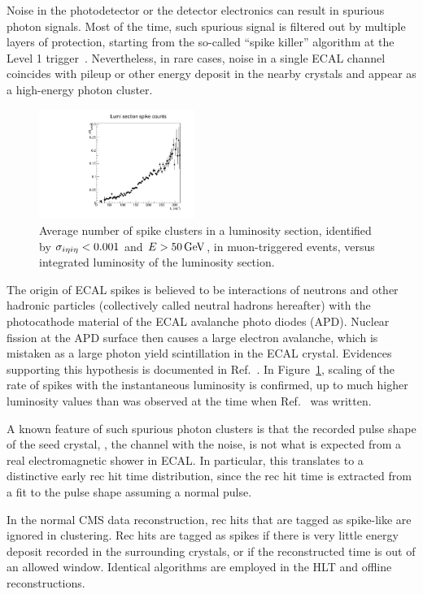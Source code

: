 Noise in the photodetector or the detector electronics can result in spurious photon signals. 
Most of the time, such spurious signal is filtered out by multiple layers of protection, starting from the so-called ``spike killer'' algorithm at the Level 1 trigger~\cite{CMS_AN_2010-357}. 
Nevertheless, in rare cases, noise in a single ECAL channel coincides with pileup or other energy deposit in the nearby crystals and appear as a high-energy photon cluster.

\begin{figure}[tbp]
  \centering
  \includegraphics[width=0.45\textwidth]{Reconstruction/Figures/spikes/spike_lumi_scaling.pdf}
  \caption{
    Average number of spike clusters in a luminosity section, identified by $\sigma_{i\eta i\eta} < 0.001$ and $E > 50\,\text{Ge\hspace{-.08em}V}$, in muon-triggered events, versus integrated luminosity of the luminosity section.
  }
  \label{fig:spike_lumi_scaling}
\end{figure}

The origin of ECAL spikes is believed to be interactions of neutrons and other hadronic particles (collectively called neutral hadrons hereafter) with the photocathode material of the ECAL avalanche photo diodes (APD). 
Nuclear fission at the APD surface then causes a large electron avalanche, which is mistaken as a large photon yield scintillation in the ECAL crystal. 
Evidences supporting this hypothesis is documented in Ref.~\cite{CMS_AN_2010-357}. 
In Figure~\ref{fig:spike_lumi_scaling}, scaling of the rate of spikes with the instantaneous luminosity is confirmed, up to much higher luminosity values than was observed at the time when Ref.~\cite{CMS_AN_2010-357} was written.

A known feature of such spurious photon clusters is that the recorded pulse shape of the seed crystal, \ie, the channel with the noise, is not what is expected from a real electromagnetic shower in ECAL. 
In particular, this translates to a distinctive early rec hit time distribution, since the rec hit time is extracted from a fit to the pulse shape assuming a normal pulse.

In the normal CMS data reconstruction, rec hits that are tagged as spike-like are ignored in clustering. 
Rec hits are tagged as spikes if there is very little energy deposit recorded in the surrounding crystals, or if the reconstructed time is out of an allowed window.
Identical algorithms are employed in the HLT and offline reconstructions.

